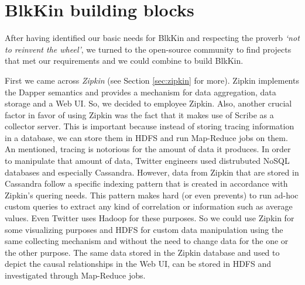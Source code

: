 \section{BlkKin building blocks}\label{sec:components}

After having identified our basic needs for BlkKin and respecting the proverb
\textit{`not to reinvent the wheel'}, we turned to the open-source community to
find projects that met our requirements and we could combine to build BlkKin.

First we came across \textit{Zipkin} (see Section \ref{sec:zipkin} for more).
Zipkin implements the Dapper semantics and provides a mechanism for data
aggregation, data storage and a Web UI. So, we decided to employee Zipkin. Also,
another crucial factor in favor of using Zipkin was the fact that it makes use
of Scribe as a collector server. This is important because instead of storing
tracing information in a database, we can store them in HDFS and run Map-Reduce
jobs on them. An mentioned, tracing is notorious for the amount of data it
produces. In order to manipulate that amount of data, Twitter engineers used
distrubuted NoSQL databases and especially Cassandra. However, data from Zipkin
that are stored in Cassandra follow a specific indexing pattern that is created
in accordance with Zipkin's quering needs. This pattern makes hard (or even
prevents) to run ad-hoc custom queries to extract any kind of correlation or
information such as average values. Even Twitter uses Hadoop for these purposes.
So we could use Zipkin for some visualizing purposes and HDFS for custom data
manipulation using the same collecting mechanism and without the need to change
data for the one or the other purpose. The same data stored in the Zipkin
database and used to depict the causal relationships in the Web UI, can be
stored in HDFS and investigated through Map-Reduce jobs.  

